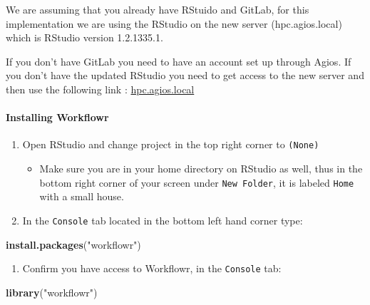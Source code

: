 \documentclass[openany]{article}
\newenvironment{Shaded}{\begin{snugshade}}{\end{snugshade}}
\newcommand{\KeywordTok}[1]{\textcolor[rgb]{0.13,0.29,0.53}{\textbf{#1}}}
\newcommand{\NormalTok}[1]{#1}
\newcommand{\StringTok}[1]{\textcolor[rgb]{0.31,0.60,0.02}{#1}}
\providecommand{\tightlist}{%
  \setlength{\itemsep}{0pt}\setlength{\parskip}{0pt}}
\let\oldparagraph\paragraph
\renewcommand{\paragraph}[1]{\oldparagraph{#1}\mbox{}}
\begin{document}
We are assuming that you already have RStuido and GitLab, for this implementation we are using the RStudio on the new server (hpc.agios.local) which is RStudio version 1.2.1335.1.

If you don't have GitLab you need to have an account set up through Agios. If you don't have the updated RStudio you need to get access to the new server and then use the following link : \href{https://hpc.agios.local}{hpc.agios.local}

\hypertarget{installing-workflowr}{%
\paragraph{Installing Workflowr}\label{installing-workflowr}}

\begin{enumerate}
\def\labelenumi{\arabic{enumi}.}
\tightlist
\item
  Open RStudio and change project in the top right corner to \texttt{(None)}

  \begin{itemize}
  \tightlist
  \item
    Make sure you are in your home directory on RStudio as well, thus in the bottom right corner of your screen under \texttt{New\ Folder}, it is labeled \texttt{Home} with a small house.
  \end{itemize}
\item
  In the \texttt{Console} tab located in the bottom left hand corner type:
\end{enumerate}

\begin{Shaded}
\begin{Highlighting}[]
\KeywordTok{install.packages}\NormalTok{(}\StringTok{"workflowr"}\NormalTok{)}
\end{Highlighting}
\end{Shaded}

\begin{enumerate}
\def\labelenumi{\arabic{enumi}.}
\setcounter{enumi}{2}
\tightlist
\item
  Confirm you have access to Workflowr, in the \texttt{Console} tab:
\end{enumerate}

\begin{Shaded}
\begin{Highlighting}[]
\KeywordTok{library}\NormalTok{(}\StringTok{"workflowr"}\NormalTok{)}
\end{Highlighting}
\end{Shaded}
\end{document}
